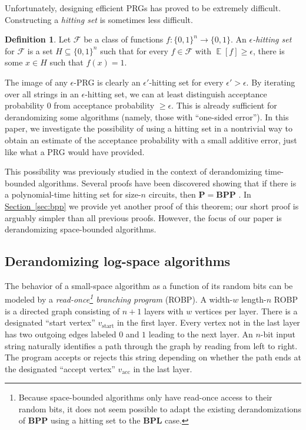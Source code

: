 \documentclass[11pt]{article}
\numberwithin{equation}{section}
\theoremstyle{definition}
\newtheorem{definition}[theorem]{Definition}
\theoremstyle{plain}
\newcommand{\expref}[2]{\hyperref[#2]{#1~\ref{#2}}}
\DeclareMathOperator*{\ExpVal}{\mathbb{E}}
\begin{document}
Unfortunately, designing efficient PRGs has proved to be extremely difficult. Constructing a \emph{hitting set} is sometimes less difficult.
\begin{definition}
Let $\mathcal{F}$ be a class of functions $f \colon \{0, 1\}^n \to \{0, 1\}$. An \emph{$\epsilon$-hitting set} for $\mathcal{F}$ is a set $H \subseteq \{0, 1\}^n$ such that for every $f \in \mathcal{F}$ with $\ExpVal[f] \geq \epsilon$, there is some $x \in H$ such that $f(x) = 1$.
\end{definition}
The image of any $\epsilon$-PRG is clearly an $\epsilon'$-hitting set for every $\epsilon' > \epsilon$. By iterating over all strings in an $\epsilon$-hitting set, we can at least distinguish acceptance probability $0$ from acceptance probability $\geq \epsilon$. This is already sufficient for derandomizing some algorithms (namely, those with ``one-sided error''). In this paper, we investigate the possibility of using a hitting set in a nontrivial way to obtain an estimate of the acceptance probability with a small additive error, just like what a PRG would have provided.

This possibility was previously studied in the context of derandomizing time-bounded algorithms. Several proofs have been discovered showing that if there is a polynomial-time hitting set for size-$n$ circuits, then $\mathbf{P} = \mathbf{BPP}$ \cite{ACR98,BF99,ACRT99,GVW11}. In \expref{Section}{sec:bpp} we provide yet another proof of this theorem; our short proof is arguably simpler than all previous proofs. However, the focus of our paper is derandomizing space-bounded algorithms.

\subsection{Derandomizing log-space algorithms}

The behavior of a small-space algorithm as a function of its random bits can be modeled by a \emph{read-once\footnote{Because space-bounded algorithms only have read-once access to their random bits, it does not seem possible to adapt the existing derandomizations of $\mathbf{BPP}$ using a hitting set to the $\mathbf{BPL}$ case.} branching program} (ROBP). A width-$w$ length-$n$ ROBP is a directed graph consisting of $n + 1$ layers with $w$ vertices per layer. There is a designated ``start vertex'' $v_{\text{start}}$ in the first layer. Every vertex not in the last layer has two outgoing edges labeled $0$ and $1$ leading to the next layer. An $n$-bit input string naturally identifies a path through the graph by reading from left to right. The program accepts or rejects this string depending on whether the path ends at the designated ``accept vertex'' $v_{\text{acc}}$ in the last layer.
\end{document}
